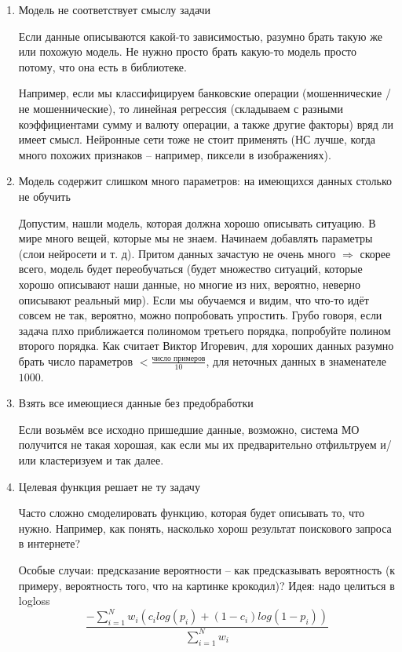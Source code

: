 \documentclass[main.tex]{subfiles}
\begin{document}
\begin{enumerate}[noitemsep]
	\item Модель не соответствует смыслу задачи
	
	Если данные описываются какой-то зависимостью, разумно брать такую же или похожую модель.
	Не нужно просто брать какую-то модель просто потому, что она есть в библиотеке.
	
	Например, если мы классифицируем банковские операции (мошеннические / не мошеннические), то линейная регрессия (складываем с разными коэффициентами сумму и валюту операции, а также другие факторы) вряд ли имеет смысл.
	Нейронные сети тоже не стоит применять (НС лучше, когда много похожих признаков -- например, пиксели в изображениях).
	
	\item Модель содержит слишком много параметров: на имеющихся данных столько не обучить
	
	Допустим, нашли модель, которая должна хорошо описывать ситуацию.
	В мире много вещей, которые мы не знаем.
	Начинаем добавлять параметры (слои нейросети и т. д).
	Притом данных зачастую не очень много $ \Rightarrow $ скорее всего, модель будет переобучаться (будет множество ситуаций, которые хорошо описывают наши данные, но многие из них, вероятно, неверно описывают реальный мир).
	Если мы обучаемся и видим, что что-то идёт совсем не так, вероятно, можно попробовать упростить.
	Грубо говоря, если задача плхо приближается полиномом третьего порядка, попробуйте полином второго порядка.
	Как считает Виктор Игоревич, для хороших данных разумно брать число параметров $ < \frac{\text{число примеров}}{10} $,
	для неточных данных в знаменателе $ 1000 $.
	
	\item Взять все имеющиеся данные без предобработки
	
	Если возьмём все исходно пришедшие данные, возможно, система МО получится не такая хорошая, как если мы их предварительно отфильтруем и/или кластеризуем и так далее.
	\item Целевая функция решает не ту задачу
	
	Часто сложно смоделировать функцию, которая будет описывать то, что нужно.
	Например, как понять, насколько хорош результат поискового запроса в интернете?
	
	Особые случаи: предсказание вероятности -- как предсказывать вероятность (к примеру, вероятность того, что на картинке крокодил)?
	Идея: надо целиться в logloss 
	$$ \frac{-\sum_{i=1}^{N}w_i(c_i log(p_i) + (1-c_i)log(1 - p_i))}{\sum_{i=1}^{N} w_i}  $$
	

\end{enumerate}
\end{document}
